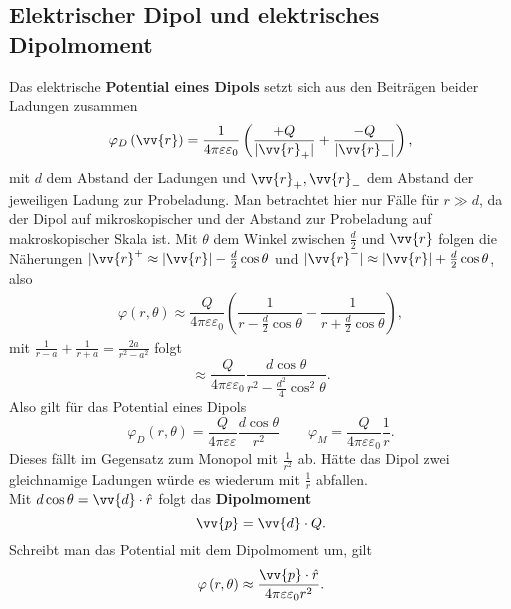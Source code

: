\subsection{Elektrischer Dipol und elektrisches Dipolmoment}
Das elektrische \textbf{Potential eines Dipols} setzt sich aus den Beiträgen beider Ladungen zusammen
\[ 
        \varphi _D\left(\vv{r}\right)=\dfrac{1}{4\pi \varepsilon \varepsilon _0}\left(\dfrac{+Q}{|\vv{r}_+|}+\dfrac{-Q}{|\vv{r}_-|}\right)
,\] 
mit $d$ dem Abstand der Ladungen und $\vv{r}_+,\vv{r}_-$ dem Abstand der jeweiligen Ladung zur Probeladung. Man betrachtet hier nur Fälle für $r\gg d$, da der Dipol auf mikroskopischer und der Abstand zur Probeladung auf makroskopischer Skala ist. Mit $\theta $ dem Winkel zwischen $\tfrac{d}{2}$ und $\vv{r}$ folgen die Näherungen $|\vv{r}^+\approx |\vv{r}|-\tfrac{d}{2}\cos \theta $ und $|\vv{r}^-|\approx |\vv{r}|+\tfrac{d}{2}\cos \theta $, also
\begin{align*}
        \varphi \left(r,\theta \right)\approx \dfrac{Q}{4\pi \varepsilon \varepsilon _0}\left(\dfrac{1}{r-\tfrac{d}{2}\cos \theta  }-\dfrac{1}{r+\tfrac{d}{2}\cos \theta }\right)
,\end{align*}
mit $\tfrac{1}{r-a}+\tfrac{1}{r+a}=\tfrac{2a}{r^2-a^2}$ folgt
\[ 
        \approx \dfrac{Q}{4\pi \varepsilon \varepsilon _0}\dfrac{d\cos \theta }{r^2-\tfrac{d^2}{4}\cos ^2\theta }
.\] 
Also gilt für das Potential eines Dipols
\[ 
        \varphi _D\left(r,\theta \right)=\dfrac{Q}{4\pi \varepsilon \varepsilon }\dfrac{d\cos \theta }{r^2}\qquad \varphi _M=\dfrac{Q}{4\pi \varepsilon \varepsilon _0}\dfrac{1}{r}
.\] 
Dieses fällt im Gegensatz zum Monopol mit $\tfrac{1}{r^2}$ ab. Hätte das Dipol zwei gleichnamige Ladungen würde es wiederum mit $\tfrac{1}{r}$ abfallen.\\\indent
Mit $d\cos \theta =\vv{d}\cdot \hat{r}$ folgt das \textbf{Dipolmoment} 
\[ 
        \vv{p}=\vv{d}\cdot Q
.\] 
Schreibt man das Potential mit dem Dipolmoment um, gilt
\[ 
        \varphi \left(r,\theta \right)\approx \dfrac{\vv{p}\cdot \hat{r}}{4\pi \varepsilon \varepsilon _0r^2}
.\] 

